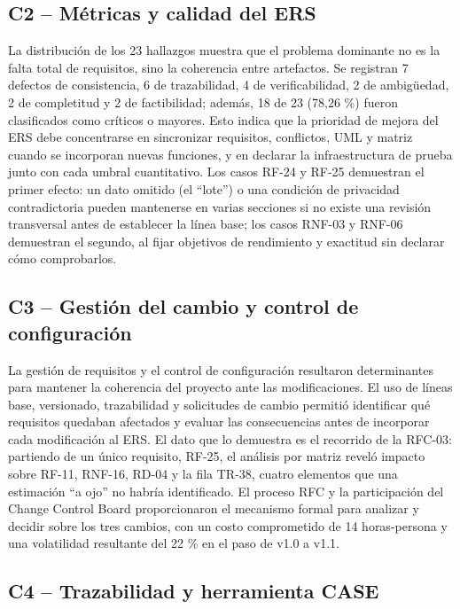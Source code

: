 \documentclass[journal,onecolumn]{IEEEtran}
\begin{document}
	\subsection*{C2 -- Métricas y calidad del ERS}
	
	La distribución de los 23 hallazgos muestra que el problema dominante no es la falta total de
	requisitos, sino la coherencia entre artefactos. Se registran 7 defectos de consistencia, 6 de
	trazabilidad, 4 de verificabilidad, 2 de ambigüedad, 2 de completitud y 2 de factibilidad; además,
	18 de 23 (78,26 \%) fueron clasificados como críticos o mayores. Esto indica que la prioridad de
	mejora del ERS debe concentrarse en sincronizar requisitos, conflictos, UML y matriz cuando se
	incorporan nuevas funciones, y en declarar la infraestructura de prueba junto con cada umbral
	cuantitativo. Los casos RF-24 y RF-25 demuestran el primer efecto: un dato omitido (el ``lote'')
	o una condición de privacidad contradictoria pueden mantenerse en varias secciones si no existe
	una revisión transversal antes de establecer la línea base; los casos RNF-03 y RNF-06 demuestran
	el segundo, al fijar objetivos de rendimiento y exactitud sin declarar cómo comprobarlos.
	
	\subsection*{C3 -- Gestión del cambio y control de configuración}
	
	La gestión de requisitos y el control de configuración resultaron determinantes para mantener la
	coherencia del proyecto ante las modificaciones. El uso de líneas base, versionado, trazabilidad y
	solicitudes de cambio permitió identificar qué requisitos quedaban afectados y evaluar las
	consecuencias antes de incorporar cada modificación al ERS. El dato que lo demuestra es el
	recorrido de la RFC-03: partiendo de un único requisito, RF-25, el análisis por matriz reveló
	impacto sobre RF-11, RNF-16, RD-04 y la fila TR-38, cuatro elementos que una estimación
	``a ojo'' no habría identificado. El proceso RFC y la participación del Change Control Board
	proporcionaron el mecanismo formal para analizar y decidir sobre los tres cambios, con un costo
	comprometido de 14 horas-persona y una volatilidad resultante del 22 \% en el paso de v1.0 a v1.1.
	
	\subsection*{C4 -- Trazabilidad y herramienta CASE}
	
\end{document}
